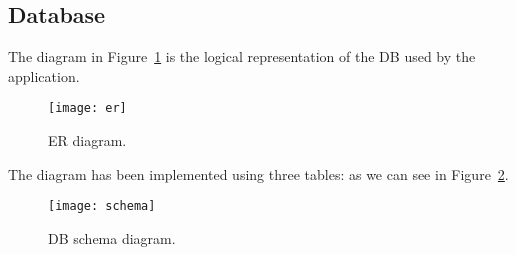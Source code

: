 \subsection{Database}

The diagram in Figure~\ref{fig:er} is the logical representation of the DB used
by the application.

\begin{figure}[ht]
	\texttt{[image: er]}
	\caption{ER diagram.}
	\label{fig:er}
\end{figure}

The diagram has been implemented using three tables: as we can see in
Figure~\ref{fig:schema}.

\begin{figure}[hb]
	\texttt{[image: schema]}
	\caption{DB schema diagram.}
	\label{fig:schema}
\end{figure}
